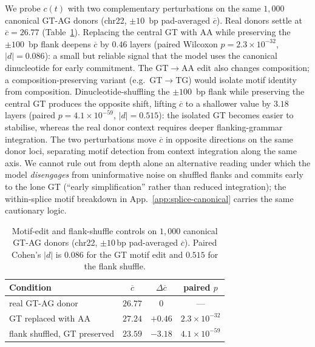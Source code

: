 \documentclass{article}
\theoremstyle{plain}
\theoremstyle{definition}
\theoremstyle{remark}
\begin{document}
We probe $c(t)$ with two complementary perturbations on the same $1{,}000$ canonical GT-AG donors (chr22, $\pm 10$~bp pad-averaged $\overline{c}$). Real donors settle at $\overline{c}\!=\!26.77$ (Table~\ref{tab:motif-flank-main}). Replacing the central GT with AA while preserving the $\pm 100$~bp flank deepens $\overline{c}$ by $0.46$ layers (paired Wilcoxon $p\!=\!2.3\!\times\!10^{-32}$, $|d|\!=\!0.086$): a small but reliable signal that the model uses the canonical dinucleotide for early commitment. The GT$\!\to\!$AA edit also changes composition; a composition-preserving variant (e.g.\ GT$\!\to\!$TG) would isolate motif identity from composition. Dinucleotide-shuffling the $\pm 100$~bp flank while preserving the central GT produces the opposite shift, lifting $\overline{c}$ to a shallower value by $3.18$ layers (paired $p\!=\!4.1\!\times\!10^{-59}$, $|d|\!=\!0.515$): the isolated GT becomes easier to stabilise, whereas the real donor context requires deeper flanking-grammar integration. The two perturbations move $\overline{c}$ in opposite directions on the same donor loci, separating motif detection from context integration along the same axis. We cannot rule out from depth alone an alternative reading under which the model \emph{disengages} from uninformative noise on shuffled flanks and commits early to the lone GT (``early simplification'' rather than reduced integration); the within-splice motif breakdown in App.~\ref{app:splice-canonical} carries the same cautionary logic.

\begin{table}[!htbp]
  \caption{Motif-edit and flank-shuffle controls on $1{,}000$ canonical GT-AG donors (chr22, $\pm 10$\,bp pad-averaged $\overline{c}$). Paired Cohen's $|d|$ is $0.086$ for the GT motif edit and $0.515$ for the flank shuffle.}
  \label{tab:motif-flank-main}
  \centering
  \small
  \begin{tabular}{@{}lccc@{}}
    \toprule
    Condition & $\overline{c}$ & $\Delta \overline{c}$ & paired $p$ \\
    \midrule
    real GT-AG donor              & $26.77$ & $0$              & --- \\
    GT replaced with AA           & $27.24$ & $+0.46$          & $2.3\!\times\!10^{-32}$ \\
    flank shuffled, GT preserved  & $23.59$ & $\mathbf{-3.18}$ & $4.1\!\times\!10^{-59}$ \\
    \bottomrule
  \end{tabular}
\end{table}
\end{document}
